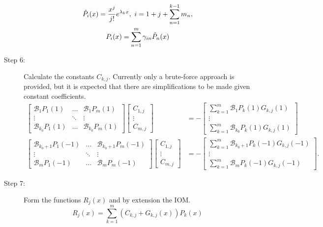\documentclass{article}
\begin{document}
\begin{description}
\begin{equation*}
\begin{gathered}
\hat{P}_i(x) = \frac{x^j}{j!} e^{\lambda_k x}, \ i = 1 + j + \sum_{n=1}^{k-1} m_n, \\
P_i(x) = \sum_{n=1}^m \gamma_{in} \hat{P}_n(x)
\end{gathered}
\end{equation*}
\item[Step 6:] Calculate the constants $C_{k,j}$.
Currently only a brute-force approach is provided, but it is expected that there are simplifications to be made given constant coefficients.
\begin{equation*}
\begin{aligned}
\begin{bmatrix} \mathcal{B}_1 P_1(1) & \dots &  \mathcal{B}_1 P_m(1) \\ \vdots & \ddots & \vdots \\  \mathcal{B}_{k_0} P_1(1) & \dots &  \mathcal{B}_{k_0} P_m(1)  \end{bmatrix}
\begin{bmatrix} C_{1,j} \\ \vdots \\ C_{m,j} \end{bmatrix}
& = - \begin{bmatrix} \sum_{k=1}^m \mathcal{B}_1 P_k(1) G_{k,j}(1) \\ \vdots \\ \sum_{k=1}^m \mathcal{B}_{k_0} P_k(1) G_{k,j}(1) \end{bmatrix} \\
\begin{bmatrix} \mathcal{B}_{k_0 + 1} P_1(-1) & \dots &  \mathcal{B}_{k_0+1} P_m(-1) \\ \vdots & \ddots & \vdots \\  \mathcal{B}_m P_1(-1) & \dots &  \mathcal{B}_m P_m(-1)  \end{bmatrix}
\begin{bmatrix} C_{1,j} \\ \vdots \\ C_{m,j} \end{bmatrix}
& = - \begin{bmatrix} \sum_{k=1}^m \mathcal{B}_{k_0+1} P_k(-1) G_{k,j}(-1) \\ \vdots \\ \sum_{k=1}^m \mathcal{B}_m P_k(-1) G_{k,j}(-1) \end{bmatrix} .
\end{aligned}
\end{equation*}
\item[Step 7:] Form the functions $R_j(x)$ and by extension the IOM.
\begin{equation*}
R_j(x) = \sum_{k=1}^m (C_{k,j} + G_{k,j}(x) ) P_k(x)
\end{equation*}
\end{description}
\end{document}
